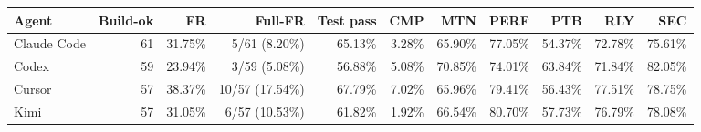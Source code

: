 \begin{tabular}{lrrrrrrrrrr}
\toprule
Agent & Build-ok & FR & Full-FR & Test pass & CMP & MTN & PERF & PTB & RLY & SEC \\
\midrule
Claude Code & 61 & 31.75\% & 5/61 (8.20\%) & 65.13\% & 3.28\% & 65.90\% & 77.05\% & 54.37\% & 72.78\% & 75.61\% \\
Codex & 59 & 23.94\% & 3/59 (5.08\%) & 56.88\% & 5.08\% & 70.85\% & 74.01\% & 63.84\% & 71.84\% & 82.05\% \\
Cursor & 57 & 38.37\% & 10/57 (17.54\%) & 67.79\% & 7.02\% & 65.96\% & 79.41\% & 56.43\% & 77.51\% & 78.75\% \\
Kimi & 57 & 31.05\% & 6/57 (10.53\%) & 61.82\% & 1.92\% & 66.54\% & 80.70\% & 57.73\% & 76.79\% & 78.08\% \\
\bottomrule
\end{tabular}
